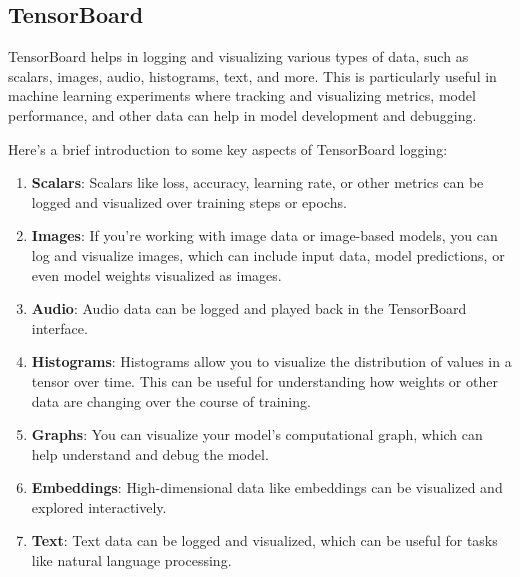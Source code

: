 \subsection{TensorBoard}
TensorBoard helps in logging and visualizing various types of data, such as scalars, images, audio, histograms, text, and more. This is particularly useful in machine learning experiments where tracking and visualizing metrics, model performance, and other data can help in model development and debugging.

Here's a brief introduction to some key aspects of TensorBoard logging:
\begin{enumerate}
    \item \textbf{Scalars}: Scalars like loss, accuracy, learning rate, or other metrics can be logged and visualized over training steps or epochs.
    \item \textbf{Images}: If you're working with image data or image-based models, you can log and visualize images, which can include input data, model predictions, or even model weights visualized as images.
    \item \textbf{Audio}: Audio data can be logged and played back in the TensorBoard interface.
    \item \textbf{Histograms}: Histograms allow you to visualize the distribution of values in a tensor over time. This can be useful for understanding how weights or other data are changing over the course of training.
    \item \textbf{Graphs}: You can visualize your model's computational graph, which can help understand and debug the model.
    \item \textbf{Embeddings}: High-dimensional data like embeddings can be visualized and explored interactively.
    \item \textbf{Text}: Text data can be logged and visualized, which can be useful for tasks like natural language processing.
\end{enumerate}